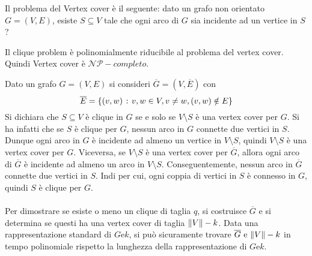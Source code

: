 \documentclass{subfiles}
\begin{document}
Il problema del Vertex cover è il seguente: dato un grafo non orientato \(G = (V, E)\), esiste \(S \subseteq V\) tale che ogni arco di \(G\) sia incidente ad un vertice in \(S\)?
\begin{Theorem}
    Il clique problem è polinomialmente riducibile al problema del vertex cover. Quindi Vertex cover è \(\mathcal{NP}-completo\).

    \begin{Proof*}
        Dato un grafo \(G = (V, E)\) si consideri \(\overline{G} = (V, \overline{E})\) con
        \[
            \overline{E} = \left\{(v, w) \operatorname{\: {:} \:} v, w \in V, v \ne w, (v, w) \notin E\right\}
        \]
        Si dichiara che \(S \subseteq V\) è clique in \(G\) se e solo se \(V \setminus S\) è una vertex cover per \(G\).
        Si ha infatti che se \(S\) è clique per \(G\), nessun arco in \(G\) connette due vertici in \(S\).
        Dunque ogni arco in \(G\) è incidente ad almeno un vertice in \(V \setminus S\), quindi \(V \setminus S\) è una vertex cover per \(G\).
        Viceversa, se \(V \setminus S\) è una vertex cover per \(\overline{G}\), allora ogni arco di \(\overline{G}\) è incidente ad almeno un arco in \(V \setminus S\).
        Conseguentemente, nessun arco in \(\overline{G}\) connette due vertici in \(S\).
        Indi per cui, ogni coppia di vertici in \(S\) è connesso in \(G\), quindi \(S\) è clique per \(G\).
        \\ \\
        Per dimostrare se esiste o meno un clique di taglia \(q\), si costruisce \(\overline{G}\) e si determina se questi ha una vertex cover di taglia \(\norm{V} - k\).
        Data una rappresentazione standard di \(G \text{e} k\), si può sicuramente trovare \(\overline{G} \text{e} \norm{V} - k\) in tempo polinomiale rispetto la lunghezza della rappresentazione di \(G \text{e} k\).
    \end{Proof*}
\end{Theorem}
\end{document}
